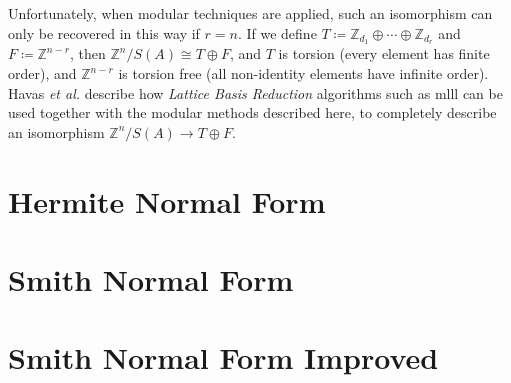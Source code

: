 \documentclass[12pt,a4paper,answers]{exam}
\newcommand{\Z}{\mathbb{Z}}
\theoremstyle{definition}
\begin{document}
Unfortunately, when modular techniques are applied, such an isomorphism can only be recovered in this way if $r=n$. If we define $T\coloneqq\Z_{d_1}\oplus\cdots\oplus\Z_{d_r}$ and $F\coloneqq\Z^{n-r}$, then $\Z^n/S(A)\cong T\oplus F$, and $T$ is torsion (every element has finite order), and $\Z^{n-r}$ is torsion free (all non-identity elements have infinite order). Havas \emph{et al.} \cite{havas} describe how \emph{Lattice Basis Reduction} algorithms such as {\sc mlll} can be used together with the modular methods described here, to completely describe an isomorphism $\Z^n/S(A)\to T\oplus F$.

\printbibliography
\clearpage

\begin{appendices}

\section{Hermite Normal Form}

\label{hnfcode}



\clearpage

\section{Smith Normal Form}

\label{snfcode}



\clearpage

\section{Smith Normal Form Improved}

\label{snfimprovedcode}



\end{appendices}
\end{document}
